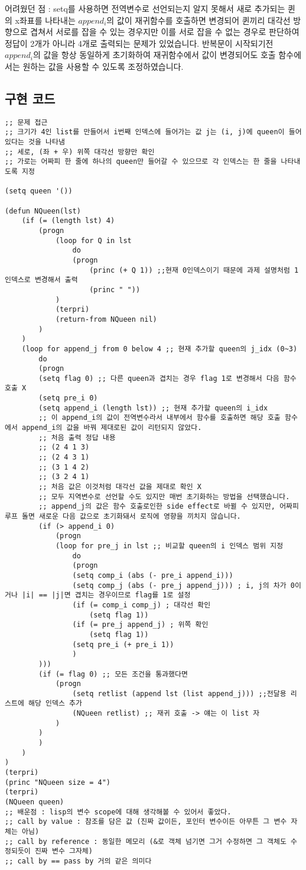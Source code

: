 \documentclass[11pt,oneside,a4paper]{article}
\begin{document}
어려웠던 점 : setq를 사용하면 전역변수로 선언되는지 알지 못해서 새로 추가되는 퀸의 x좌표를 나타내는 $append_i$의 값이 재귀함수를 호출하면 변경되어 퀸끼리 대각선 방향으로 겹쳐서 서로를 잡을 수 있는 경우지만
이를 서로 잡을 수 없는 경우로 판단하여 정답이 2개가 아니라 4개로 출력되는 문제가 있었습니다.
반복문이 시작되기전 $append_i$의 값을 항상 동일하게 초기화하여 재귀함수에서 값이 변경되어도 호출 함수에서는 원하는 값을 사용할 수 있도록 조정하였습니다.

\subsection{구현 코드}
\begin{verbatim} 
;; 문제 접근
;; 크기가 4인 list를 만들어서 i번째 인덱스에 들어가는 값 j는 (i, j)에 queen이 들어있다는 것을 나타냄
;; 세로, (좌 + 우) 위쪽 대각선 방향만 확인
;; 가로는 어짜피 한 줄에 하나의 queen만 들어갈 수 있으므로 각 인덱스는 한 줄을 나타내도록 지정

(setq queen '())

(defun NQueen(lst)
	(if (= (length lst) 4) 
		(progn
			(loop for Q in lst
				do
				(progn 
					(princ (+ Q 1)) ;;현재 0인덱스이기 때문에 과제 설명처럼 1인덱스로 변경해서 출력
					(princ " "))
			)
			(terpri)
			(return-from NQueen nil)
		)
	)
	(loop for append_j from 0 below 4 ;; 현재 추가할 queen의 j_idx (0~3)
		do
		(progn
		(setq flag 0) ;; 다른 queen과 겹치는 경우 flag 1로 변경해서 다음 함수 호출 X
		(setq pre_i 0)
		(setq append_i (length lst)) ;; 현재 추가할 queen의 i_idx
		;; 이 append_i의 값이 전역변수라서 내부에서 함수를 호출하면 해당 호출 함수에서 append_i의 값을 바꿔 제대로된 값이 리턴되지 않았다.
		;; 처음 출력 정답 내용
		;; (2 4 1 3) 
		;; (2 4 3 1) 
		;; (3 1 4 2) 
		;; (3 2 4 1) 
		;; 처음 값은 이것처럼 대각선 값을 제대로 확인 X
		;; 모두 지역변수로 선언할 수도 있지만 매번 초기화하는 방법을 선택했습니다.
		;; append_j의 값은 함수 호출로인한 side effect로 바뀔 수 있지만, 어짜피 루프 돌면 새로운 다음 값으로 초기화돼서 로직에 영향을 끼치지 않습니다.
		(if (> append_i 0)
			(progn
			(loop for pre_j in lst ;; 비교할 queen의 i 인덱스 범위 지정
				do
				(progn
				(setq comp_i (abs (- pre_i append_i)))
				(setq comp_j (abs (- pre_j append_j))) ; i, j의 차가 0이거나 |i| == |j|면 겹치는 경우이므로 flag를 1로 설정
				(if (= comp_i comp_j) ; 대각선 확인
					(setq flag 1))
				(if (= pre_j append_j) ; 위쪽 확인
					(setq flag 1))
				(setq pre_i (+ pre_i 1))
				)
		)))
		(if (= flag 0) ;; 모든 조건을 통과했다면
			(progn
				(setq retlist (append lst (list append_j))) ;;전달용 리스트에 해당 인덱스 추가
				(NQueen retlist) ;; 재귀 호출 -> 얘는 이 list 자
			)
		)
		)
	)
)
(terpri)
(princ "NQueen size = 4")
(terpri)
(NQueen queen)
;; 배운점 : lisp의 변수 scope에 대해 생각해볼 수 있어서 좋았다.
;; call by value : 참조를 담은 값 (진짜 값이든, 포인터 변수이든 아무튼 그 변수 자체는 아님)
;; call by reference : 동일한 메모리 (&로 객체 넘기면 그거 수정하면 그 객체도 수정되듯이 진짜 변수 그자체)
;; call by == pass by 거의 같은 의미다
\end{verbatim}
\end{document}

